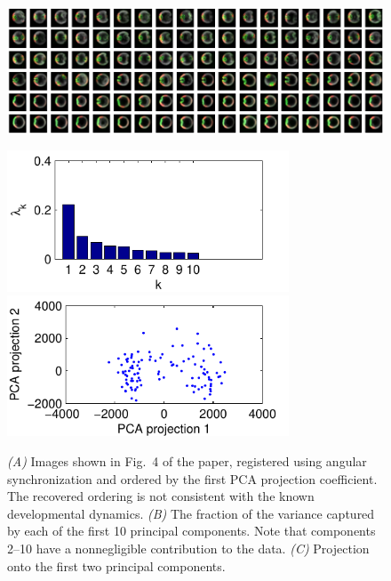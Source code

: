 \documentclass{pnastwo}
\newcommand{\fig}[0]{Fig.}
\begin{document}
\begin{figure}
\includegraphics[width=16.8cm]{data2_PCA_ordered}

\includegraphics[width=8.4cm]{data2_PCA_variance}
\includegraphics[width=8.4cm]{data2_PCA_proj}

\caption{{\it (A)} Images shown in \fig~4 of the paper, registered using angular synchronization \cite{singer2011angular} and ordered by the first PCA projection coefficient. The recovered ordering is not consistent with the known developmental dynamics. {\it (B)} The fraction of the variance captured by each of the first 10 principal components. Note that components 2--10 have a nonnegligible contribution to the data. {\it (C)} Projection onto the first two principal components.}
\label{fig:PCA_results}
\end{figure}
\end{document}
